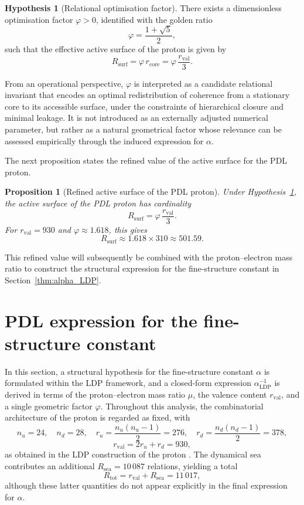 \documentclass[11pt,a4paper]{article}
\theoremstyle{plain}
\newtheorem{proposition}{Proposition}
\theoremstyle{definition}
\newtheorem{hypothesis}{Hypothesis}
\theoremstyle{remark}
\begin{document}
\begin{hypothesis}[Relational optimisation factor]
  \label{hyp:phi_recap}
  There exists a dimensionless optimisation factor \(\varphi > 0\), identified
  with the golden ratio
  \[
    \varphi = \frac{1 + \sqrt{5}}{2},
  \]
  such that the effective active surface of the proton is given by
  \[
    R_{\mathrm{surf}} = \varphi\, r_{\mathrm{core}}
    = \varphi\,\frac{r_{\mathrm{val}}}{3}.
  \]
\end{hypothesis}

From an operational perspective, \(\varphi\) is interpreted as a candidate relational invariant that encodes an optimal redistribution of coherence from a stationary core to its accessible surface, under the constraints of hierarchical closure and minimal leakage. It is not introduced as an externally adjusted numerical parameter, but rather as a natural geometrical factor whose relevance can be assessed empirically through the induced expression for \(\alpha\).

The next proposition states the refined value of the active surface for the PDL proton.

\begin{proposition}[Refined active surface of the PDL proton]
  \label{prop:Rsurf_refined_recap}
  Under Hypothesis~\ref{hyp:phi_recap}, the active surface of the PDL proton
  has cardinality
  \[
    R_{\mathrm{surf}} = \varphi\,\frac{r_{\mathrm{val}}}{3}.
  \]
  For \(r_{\mathrm{val}} = 930\) and \(\varphi \approx 1.618\), this gives
  \[
    R_{\mathrm{surf}} \approx 1.618 \times 310 \approx 501.59.
  \]
\end{proposition}

This refined value will subsequently be combined with the proton–electron mass ratio to construct the structural expression for the fine-structure constant in Section~\ref{thm:alpha_LDP}.

\section{PDL expression for the fine-structure constant}

In this section, a structural hypothesis for the fine-structure constant \(\alpha\) is formulated within the LDP framework, and a closed-form expression \(\alpha_{\mathrm{LDP}}^{-1}\) is derived in terms of the proton–electron mass ratio \(\mu\), the valence content \(r_{\mathrm{val}}\), and a single geometric factor \(\varphi\). Throughout this analysis, the combinatorial architecture of the proton is regarded as fixed, with
\[
  n_u = 24, \quad n_d = 28, \quad
  r_u = \frac{n_u(n_u-1)}{2} = 276, \quad
  r_d = \frac{n_d(n_d-1)}{2} = 378,
\]
\[
  r_{\mathrm{val}} = 2 r_u + r_d = 930,
\]
as obtained in the LDP construction of the proton \cite{Laubscher2026PDL_English,Laubscher2026LDP_French}. The dynamical sea contributes an additional \(R_{\mathrm{sea}} = 10\,087\) relations, yielding a total
\[
  R_{\mathrm{tot}} = r_{\mathrm{val}} + R_{\mathrm{sea}} = 11\,017,
\]
although these latter quantities do not appear explicitly in the final expression for \(\alpha\).
\end{document}
